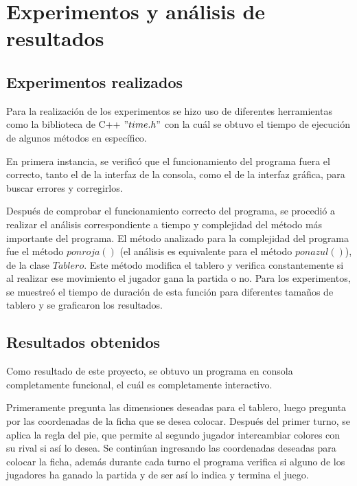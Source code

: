 \documentclass[12pt,letterpaper]{article}
\begin{document}
\section{Experimentos y análisis de resultados}
\subsection{Experimentos realizados}
Para la realización de los experimentos se hizo uso de diferentes herramientas como la biblioteca de C++ $"time.h"$ con la cuál se obtuvo el tiempo de ejecución de algunos métodos en específico.

En primera instancia, se verificó que el funcionamiento del programa fuera el correcto, tanto el de la interfaz de la consola, como el de la interfaz gráfica, para buscar errores y corregirlos.

Después de comprobar el funcionamiento correcto del programa, se procedió a realizar el análisis correspondiente a tiempo y complejidad del método más importante del programa. El método analizado para la complejidad del programa fue el método $ponroja()$ (el análisis es equivalente para el método $ponazul()$), de la clase $Tablero$. Este método modifica el tablero y verifica constantemente si al realizar ese movimiento el jugador gana la partida o no. Para los experimentos, se muestreó el tiempo de duración de esta función para diferentes tamaños de tablero y se graficaron los resultados.
\subsection{Resultados obtenidos}
Como resultado de este proyecto, se obtuvo un programa en consola completamente funcional, el cuál es completamente interactivo.

Primeramente pregunta las dimensiones deseadas para el tablero, luego pregunta por las coordenadas de la ficha que se desea colocar. Después del primer turno, se aplica la regla del pie, que permite al segundo jugador intercambiar colores con su rival si así lo desea. Se continúan ingresando las coordenadas deseadas para colocar la ficha, además durante cada turno el programa verifica si alguno de los jugadores ha ganado la partida y de ser así lo indica y termina el juego.
\end{document}
